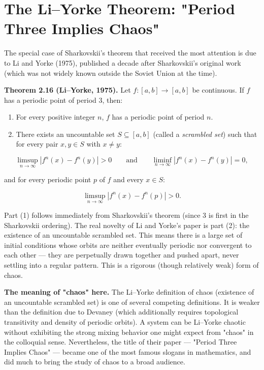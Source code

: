 \section{The Li–Yorke Theorem: "Period Three Implies Chaos"}\label{sec:2.8}

The special case of Sharkovskii's theorem that received the most attention is due to Li and Yorke (1975), published a decade after Sharkovskii's original work (which was not widely known outside the Soviet Union at the time).

\textbf{Theorem 2.16 (Li--Yorke, 1975).} Let $f: [a,b] \to [a,b]$ be continuous. If $f$ has a periodic point of period 3, then:

\begin{enumerate}[nosep]
  \item For every positive integer $n$, $f$ has a periodic point of period $n$.
  \item There exists an uncountable set $S \subseteq [a,b]$ (called a \textit{scrambled set}) such that for every pair $x, y \in S$ with $x \neq y$:
\end{enumerate}

\[
\limsup_{n \to \infty} |f^n(x) - f^n(y)| > 0 \qquad \text{and} \qquad \liminf_{n \to \infty} |f^n(x) - f^n(y)| = 0,
\]

and for every periodic point $p$ of $f$ and every $x \in S$:

\[
\limsup_{n \to \infty} |f^n(x) - f^n(p)| > 0.
\]

Part (1) follows immediately from Sharkovskii's theorem (since 3 is first in the Sharkovskii ordering). The real novelty of Li and Yorke's paper is part (2): the existence of an uncountable scrambled set. This means there is a large set of initial conditions whose orbits are neither eventually periodic nor convergent to each other --- they are perpetually drawn together and pushed apart, never settling into a regular pattern. This is a rigorous (though relatively weak) form of chaos.

\textbf{The meaning of "chaos" here.} The Li--Yorke definition of chaos (existence of an uncountable scrambled set) is one of several competing definitions. It is weaker than the definition due to Devaney (which additionally requires topological transitivity and density of periodic orbits). A system can be Li--Yorke chaotic without exhibiting the strong mixing behavior one might expect from "chaos" in the colloquial sense. Nevertheless, the title of their paper --- "Period Three Implies Chaos" --- became one of the most famous slogans in mathematics, and did much to bring the study of chaos to a broad audience.

